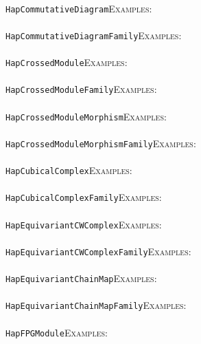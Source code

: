 \documentclass[a4paper,11pt]{report}
\begin{document}
{{ \\
 \texttt{HapCommutativeDiagram}{\nobreakspace}{\nobreakspace}{\nobreakspace}{\nobreakspace}\textsc{Examples:} \\
 \\
 \texttt{HapCommutativeDiagramFamily}{\nobreakspace}{\nobreakspace}{\nobreakspace}{\nobreakspace}\textsc{Examples:} \\
 \\
 \texttt{HapCrossedModule}{\nobreakspace}{\nobreakspace}{\nobreakspace}{\nobreakspace}\textsc{Examples:} \\
 \\
 \texttt{HapCrossedModuleFamily}{\nobreakspace}{\nobreakspace}{\nobreakspace}{\nobreakspace}\textsc{Examples:} \\
 \\
 \texttt{HapCrossedModuleMorphism}{\nobreakspace}{\nobreakspace}{\nobreakspace}{\nobreakspace}\textsc{Examples:} \\
 \\
 \texttt{HapCrossedModuleMorphismFamily}{\nobreakspace}{\nobreakspace}{\nobreakspace}{\nobreakspace}\textsc{Examples:} \\
 \\
 \texttt{HapCubicalComplex}{\nobreakspace}{\nobreakspace}{\nobreakspace}{\nobreakspace}\textsc{Examples:} \\
 \\
 \texttt{HapCubicalComplexFamily}{\nobreakspace}{\nobreakspace}{\nobreakspace}{\nobreakspace}\textsc{Examples:} \\
 \\
 \texttt{HapEquivariantCWComplex}{\nobreakspace}{\nobreakspace}{\nobreakspace}{\nobreakspace}\textsc{Examples:} \\
 \\
 \texttt{HapEquivariantCWComplexFamily}{\nobreakspace}{\nobreakspace}{\nobreakspace}{\nobreakspace}\textsc{Examples:} \\
 \\
 \texttt{HapEquivariantChainMap}{\nobreakspace}{\nobreakspace}{\nobreakspace}{\nobreakspace}\textsc{Examples:} \\
 \\
 \texttt{HapEquivariantChainMapFamily}{\nobreakspace}{\nobreakspace}{\nobreakspace}{\nobreakspace}\textsc{Examples:} \\
 \\
 \texttt{HapFPGModule}{\nobreakspace}{\nobreakspace}{\nobreakspace}{\nobreakspace}\textsc{Examples:} \\
 \\
}}
\end{document}
